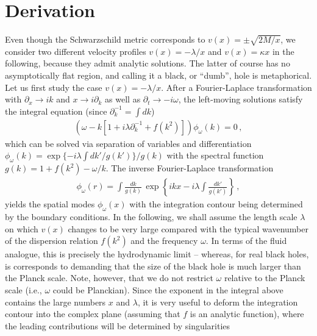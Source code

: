 \documentclass[12pt,aps,prl,showpacs,amssymb,nofootinbib,onecolumn]{revtex4-2}
\newcommand{\bea}{\begin{eqnarray}}
\newcommand{\ea}{\end{eqnarray}}
\begin{document}
\section{Derivation}\quad
%
Even though the Schwarzschild metric corresponds to
$v(x)=\pm\sqrt{2M/x}$, we consider two different velocity profiles 
$v(x)=-\lambda/x$ and $v(x)=\kappa x$ in the following, because they
admit analytic solutions. 
%
The latter of course has no asymptotically flat region, and calling
it a black, or ``dumb'', hole is metaphorical. 
%
Let us first study the case $v(x)=-\lambda/x$. 
%
After a Fourier-Laplace transformation with $\partial_x\to ik$ and 
$x\to i\partial_k$ as well as $\partial_t\to-i\omega$, 
the left-moving solutions satisfy the integral equation 
(since $\partial_k^{-1}=\int dk$)
%
\bea
\left(\omega-k\left[1+i\lambda\partial_k^{-1}+f(k^2)\right]\right)
\phi_\omega(k)=0 
\,,
\ea
%
which can be solved via separation of variables and differentiation 
$\phi_\omega(k)=\exp\{-i\lambda\int dk'/g(k')\}/g(k)$
%
%
with the spectral function $g(k)=1+f(k^2)-\omega/k$. 
%
%
The inverse Fourier-Laplace transformation 
%
\bea
\label{inverse}
\phi_\omega(r)=\int\frac{dk}{g(k)}\,
\exp\left\{ikx-i\lambda\int\frac{dk'}{g(k')}\right\}
\,,
\ea
%
yields the spatial modes $\phi_\omega(x)$ with the integration contour
being determined by the boundary conditions. 
%
In the following, we shall assume the length scale $\lambda$ on
which $v(x)$ changes to be very large compared with the typical
wavenumber of the dispersion relation $f(k^2)$ and the frequency
$\omega$. 
%
In terms of the fluid analogue, this is precisely the hydrodynamic 
limit -- whereas, for real black holes, is corresponds to demanding
that the size of the black hole is much larger than the Planck scale.  
%
Note, however, that we do not restrict $\omega$ relative to the Planck
scale (i.e., $\omega$ could be Planckian).  
%
Since the exponent in the integral above contains the large numbers
$x$ and $\lambda$, it is very useful to deform the integration contour
into the complex plane (assuming that $f$ is an analytic function),  
where the leading contributions will be determined by singularities
\end{document}
